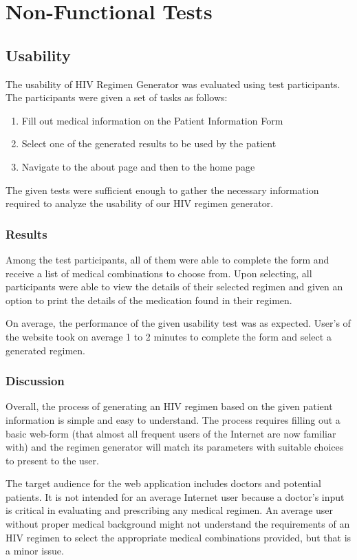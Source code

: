 \documentclass[12pt]{article}
\begin{document}
\section{Non-Functional Tests}
\subsection{Usability}
The usability of HIV Regimen Generator was evaluated using test participants. The participants were given a set of tasks as follows: 
\begin{enumerate}
\item Fill out medical information on the Patient Information Form
\item Select one of the generated results to be used by the patient
\item Navigate to the about page and then to the home page
\end{enumerate}
The given tests were sufficient enough to gather the necessary information required to analyze the usability of our HIV regimen generator. 

\subsubsection{Results}
Among the test participants, all of them were able to complete the form and receive a list of medical combinations to choose from. Upon selecting, all participants were able to view the details of their selected regimen and given an option to print the details of the medication found in their regimen. 

On average, the performance of the given usability test was as expected. User's of the website took on average 1 to 2 minutes to complete the form and select a generated regimen. 

\subsubsection{Discussion}
Overall, the process of generating an HIV regimen based on the given patient information is simple and easy to understand. The process requires filling out a basic web-form (that almost all frequent users of the Internet are now familiar with) and the regimen generator will match its parameters with suitable choices to present to the user. 

The target audience for the web application includes doctors and potential patients. It is not intended for an average Internet user because a doctor's input is critical in evaluating and prescribing any medical regimen. An average user without proper medical background might not understand the requirements of an HIV regimen to select the appropriate medical combinations provided, but that is a minor issue. 
\end{document}
